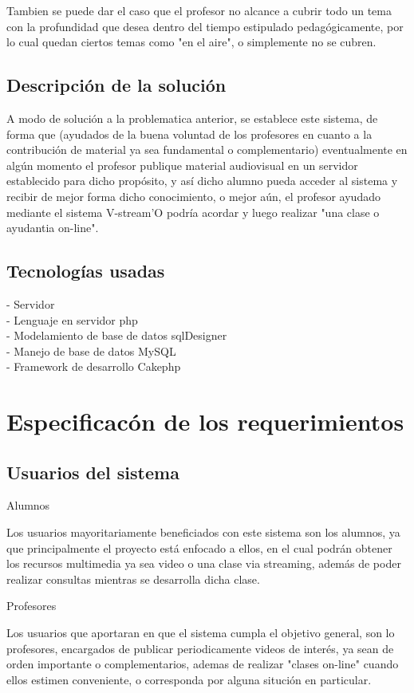 \documentclass[12pt]{article}
\begin{document}
Tambien se puede dar el caso que el profesor no alcance a cubrir todo un tema con la profundidad que desea
dentro del tiempo estipulado pedagógicamente, por lo cual quedan ciertos temas como "en el aire", o
simplemente no se cubren.


\subsection{Descripción de la solución}
A modo de solución a la problematica anterior, se establece este sistema, de forma que (ayudados de la buena
voluntad de los profesores en cuanto a la contribución de material ya sea fundamental o complementario) 
eventualmente en algún momento el profesor publique material 
audiovisual en un servidor establecido para dicho propósito, y así dicho alumno pueda acceder al sistema 
y recibir de mejor forma dicho conocimiento, o mejor aún, el profesor ayudado mediante el sistema V-stream'O podría
acordar y luego realizar "una clase o ayudantia on-line".

\subsection{Tecnologías usadas}
- Servidor\\
- Lenguaje en servidor php\\
- Modelamiento de base de datos sqlDesigner\\
- Manejo de base de datos MySQL\\
- Framework de desarrollo Cakephp\\ 


\newpage
\section{Especificacón de los requerimientos}
\subsection{Usuarios del sistema}
Alumnos

Los usuarios mayoritariamente beneficiados con este sistema son los alumnos, ya que principalmente
el proyecto está enfocado a ellos, en el cual podrán obtener los recursos multimedia ya sea video
o una clase via streaming, además de poder realizar consultas mientras se desarrolla dicha clase.

Profesores

Los usuarios que aportaran en que el sistema cumpla el objetivo general, son lo profesores, 
encargados de publicar periodicamente videos de interés, ya sean de orden importante o complementarios, 
ademas de realizar "clases on-line" cuando ellos estimen conveniente, o corresponda por alguna situción
en particular.
\end{document}
